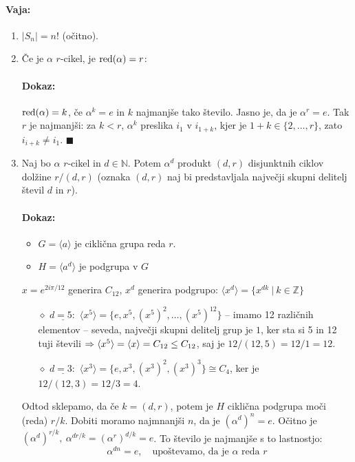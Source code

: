 \paragraph{Vaja:}
\begin{enumerate}
	\item{$|S_n| = n!$ (o\v citno).}
	\item{\v Ce je $\alpha$ $r$-cikel, je $\operatorname{red}(\alpha) = r$:
		\paragraph{Dokaz:} $\operatorname{red}(\alpha) = k$, \v ce $\alpha^k = e$ in $k$ najmanj\v se tako \v stevilo. Jasno je, da je $\alpha^r = e$. Tak
		$r$ je najmanj\v si: za $k < r$, $\alpha^k$ preslika $i_1$ v $i_{1+k}$, kjer je $1 + k \in \{2, \ldots, r\}$, zato
		$i_{i+k} \neq i_1$. $\blacksquare$}
	\item{Naj bo $\alpha$ $r$-cikel in $d \in \mathbb{N}$. Potem $\alpha^d$ produkt $(d, r)$ disjunktnih ciklov dol\v zine $r/(d,r)$ (oznaka
		$(d, r)$ naj bi predstavljala najve\v cji skupni delitelj \v stevil $d$ in $r$).
		\paragraph{Dokaz:}
		\begin{itemize}
			\item{$G = \langle a \rangle$ je cikli\v cna grupa reda $r$.}
			\item{$H = \langle a^d \rangle$ je podgrupa v $G$}
		\end{itemize}
		$x = e^{2i\pi/12}$ generira $C_{12}$, $x^d$ generira podgrupo: $\langle x^d \rangle = \{x^{dk}\ |\ k \in \mathbb{Z}\}$
		\begin{itemize}
			\item[$\diamond$]{$\underline{d = 5:}$ $\langle x^5 \rangle = \{e, x^5, (x^5)^2, \ldots, (x^5)^12\}$ -- imamo 12 razli\v cnih elementov -- seveda,
				najve\v cji skupni delitelj grup je $1$, ker sta si 5 in 12 tuji \v stevili $\Rightarrow \langle x^5 \rangle = \langle x \rangle = C_{12} \leq C_{12}$, saj
				je $12 / (12, 5) = 12/1 = 12$.}
			\item[$\diamond$]{$\underline{d = 3:}$ $\langle x^3 \rangle = \{e, x^3, (x^3)^2, (x^3)^3\} \cong C_4$, ker je $12 / (12, 3) = 12/3 = 4$.}
		\end{itemize} Odtod sklepamo, da \v ce $k = (d, r)$, potem je $H$ cikli\v cna podgrupa mo\v ci (reda) $r/k$. Dobiti moramo najmnanj\v si $n$, da je
		$(\alpha^d)^n  = e$. O\v citno je $(\alpha^d)^{r/k},\ \alpha^{dr/k} = (\alpha^r)^{d/k} = e$. To \v stevilo je najmanj\v se s to lastnostjo:
		\[
			\alpha^{dn} = e,\quad \text{upo\v stevamo, da je $\alpha$ reda $r$}
		\]

}
\end{enumerate}
